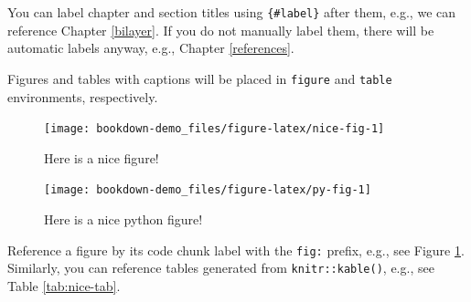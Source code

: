 \documentclass[]{book}
\begin{document}
You can label chapter and section titles using \texttt{\{\#label\}}
after them, e.g., we can reference Chapter \ref{bilayer}. If you do not
manually label them, there will be automatic labels anyway, e.g.,
Chapter \ref{references}.

Figures and tables with captions will be placed in \texttt{figure} and
\texttt{table} environments, respectively.

\begin{figure}

{\centering \texttt{[image: bookdown-demo\_files/figure-latex/nice-fig-1]} 

}

\caption{Here is a nice figure!}\label{fig:nice-fig}
\end{figure}

\begin{figure}

{\centering \texttt{[image: bookdown-demo\_files/figure-latex/py-fig-1]} 

}

\caption{Here is a nice python figure!}\label{fig:py-fig}
\end{figure}

Reference a figure by its code chunk label with the \texttt{fig:}
prefix, e.g., see Figure \ref{fig:nice-fig}. Similarly, you can
reference tables generated from \texttt{knitr::kable()}, e.g., see Table
\ref{tab:nice-tab}.
\end{document}
